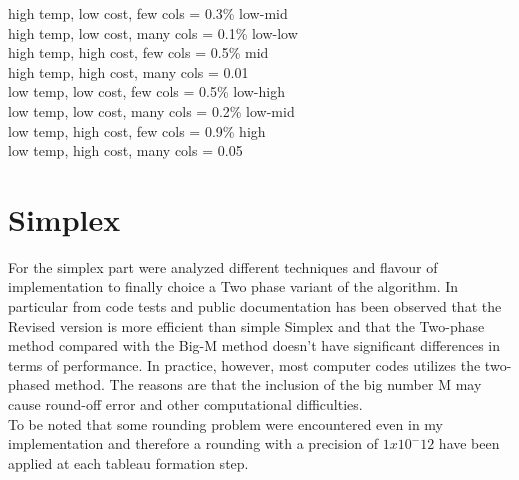 ﻿\documentclass[a4paper]{article}
\begin{document}
\hfill\begin{minipage}{\dimexpr\textwidth-2cm}
high temp, low cost, few cols = 0.3\quad\quad\quad\% low-mid\\
high temp, low cost, many cols = 0.1\quad\quad\quad\% low-low\\
high temp, high cost, few cols = 0.5\quad\quad\quad\% mid\\
high temp, high cost, many cols = 0.01\quad\quad\quad\\
low temp, low cost, few cols = 0.5\quad\quad\quad\% low-high\\
low temp, low cost, many cols = 0.2\quad\quad\quad\% low-mid\\
low temp, high cost, few cols = 0.9\quad\quad\quad\% high\\
low temp, high cost, many cols = 0.05\quad\quad\quad\\
\end{minipage}

\section{Simplex}
For the simplex part were analyzed different techniques and flavour of implementation to finally choice a Two phase variant of the algorithm. In particular from code tests and public documentation has been observed that the Revised version is more efficient than simple Simplex and that the Two-phase method compared with the Big-M method doesn't have significant differences in terms of performance. In practice, however, most computer codes utilizes the two-phased method. The reasons are that the inclusion of the big number M may cause round-off error and other computational difficulties.\\
To be noted that some rounding problem were encountered even in my implementation and therefore a rounding with a precision of $1x10^-12$ have been applied at each tableau formation step.\\
\end{document}
